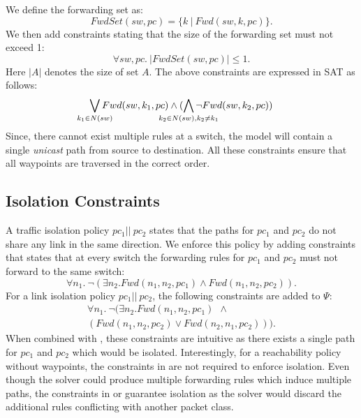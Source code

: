 We define the forwarding set as:
\begin{equation}
	FwdSet(sw,pc) = \{k \ | \ Fwd(sw,k,pc)\}.
\end{equation}
We then add constraints stating that the size of the forwarding set must not exceed 1:
\begin{equation}
		\forall sw,pc .\ |FwdSet(sw,pc)| \leq 1 \label{eq:fwdset}.
\end{equation}
Here $|A|$ denotes the size of set $A$. The above constraints are expressed 
in SAT as follows: 
\begin{equation}
\bigvee_{\mathclap{k_1 \in N(sw)}} Fwd(sw, k_1, pc) \wedge (\bigwedge_{\mathclap{k_2 \in N(sw), k_2 \not= k_1}} \neg Fwd(sw, k_2, pc))
\end{equation}
Since, there cannot exist multiple rules at a switch, the model will contain a 
single {\em unicast} path from source to destination. 
All these constraints ensure that all waypoints are traversed in the correct order. 

\subsection{Isolation Constraints}
A traffic isolation policy $pc_1 || \ pc_2$ states that the paths for
$pc_1$ and $pc_2$ do not share any link in the same direction.  We
enforce this policy by adding constraints that states that at every
switch the forwarding rules for $pc_1$ and $pc_2$ must not forward to
the same switch:
\begin{equation}
	\forall n_1.~\neg ( \exists n_2. Fwd(n_1,n_2,pc_1) \wedge Fwd(n_1,n_2,pc_2)). \label{eq:isolation}
\end{equation}
For a link isolation policy $pc_1 || \ pc_2$, the following constraints are 
added to $\Psi$:
\begin{multline}
\forall n_1.~\neg ( \exists n_2. Fwd(n_1,n_2,pc_1) ~~\wedge \\ (Fwd(n_1,n_2,pc_2) \vee Fwd(n_2,n_1,pc_2))). \label{eq:linkisolation}
\end{multline}
When combined with , these constraints are intuitive  
as there exists a single path for $pc_1$ and
$pc_2$ which would be isolated. 
Interestingly, for a reachability policy without waypoints,  
the constraints in  are not required to enforce isolation. 
Even though the solver could produce multiple forwarding rules which induce multiple paths, 
the constraints in  or  guarantee isolation as the solver would discard
the additional rules conflicting with another packet class.

